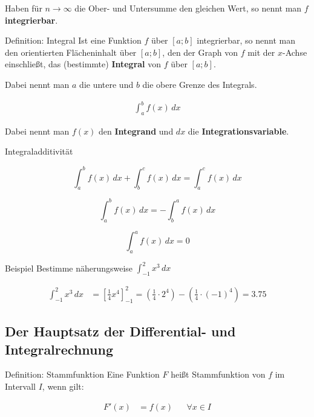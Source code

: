 \documentclass{article}
\begin{document}
Haben für $n \to \infty$ die Ober- und Untersumme den gleichen Wert,
so nennt man $f$ \textbf{integrierbar}.
\newpage
\begin{boxx}[Red]{Definition: Integral}
    Ist eine Funktion $f$ über $[a;b]$ integrierbar,
    so nennt man den orientierten Flächeninhalt über $[a;b]$,
    den der Graph von $f$ mit der $x$-Achse einschließt,
    das (bestimmte) \textbf{Integral} von $f$ über $[a;b]$.

    Dabei nennt man $a$ die untere und $b$ die obere Grenze des Integrals.

    \begin{align*}
        \int_a^b f(x) \, dx
    \end{align*}

    Dabei nennt man $f(x)$ den \textbf{Integrand} und $dx$ die \textbf{Integrationsvariable}.
\end{boxx}

\begin{boxx}[LightGreen]{Integraladditivität}

    \[\int_a^b f(x) \, dx + \int_b^c f(x) \, dx = \int_a^c f(x) \, dx\]

    \[\int_a^b f(x) \, dx = - \int_b^a f(x) \, dx\]

    \[\int_a^a f(x) \, dx = 0\]

\end{boxx}

\begin{boxx}[DarkBlue]{Beispiel}
    Bestimme näherungsweise $\displaystyle \int_{-1}^2 x^3 \, dx$

    \begin{align*}
        \int_{-1}^2 x^3 \, dx &= \left[\frac{1}{4}x^4\right]_{-1}^2
        = \left(\frac{1}{4}\cdot 2^4\right) - \left(\frac{1}{4} \cdot (-1)^4\right)
        = 3.75
    \end{align*}
\end{boxx}


\subsection{Der Hauptsatz der Differential- und Integralrechnung}

\begin{boxx}[Red]{Definition: Stammfunktion}
    Eine Funktion $F$ heißt Stammfunktion von $f$ im Intervall $I$, wenn gilt:

    \begin{align*}
        &&&&&& F'(x) &= f(x) & &\forall x \in I &&&&&&
    \end{align*}
\end{boxx}
\end{document}
